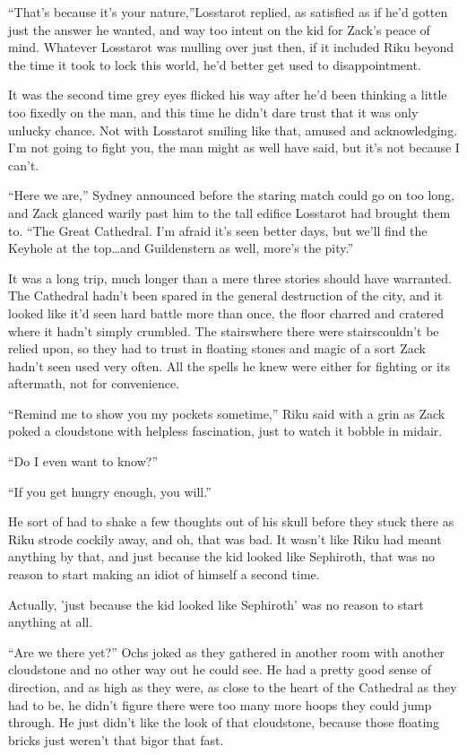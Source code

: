 ``That's because it's your nature,''Losstarot replied, as satisfied as if he'd gotten just the answer he wanted, and way too intent on the kid for Zack's peace of mind. Whatever Losstarot was mulling over just then, if it included Riku beyond the time it took to lock this world, he'd better get used to disappointment.

It was the second time grey eyes flicked his way after he'd been thinking a little too fixedly on the man, and this time he didn't dare trust that it was only unlucky chance. Not with Losstarot smiling like that, amused and acknowledging. I'm not going to fight you, the man might as well have said, but it's not because I can't.

``Here we are,'' Sydney announced before the staring match could go on too long, and Zack glanced warily past him to the tall edifice Losstarot had brought them to. ``The Great Cathedral. I'm afraid it's seen better days, but we'll find the Keyhole at the top\ldots and Guildenstern as well, more's the pity.''

It was a long trip, much longer than a mere three stories should have warranted. The Cathedral hadn't been spared in the general destruction of the city, and it looked like it'd seen hard battle more than once, the floor charred and cratered where it hadn't simply crumbled. The stairs\textemdash where there were stairs\textemdash couldn't be relied upon, so they had to trust in floating stones and magic of a sort Zack hadn't seen used very often. All the spells he knew were either for fighting or its aftermath, not for convenience.

``Remind me to show you my pockets sometime,'' Riku said with a grin as Zack poked a cloudstone with helpless fascination, just to watch it bobble in midair.

``Do I even want to know?''

``If you get hungry enough, you will.''

He sort of had to shake a few thoughts out of his skull before they stuck there as Riku strode cockily away, and oh, that was bad. It wasn't like Riku had meant anything by that, and just because the kid looked like Sephiroth, that was no reason to start making an idiot of himself a second time.

Actually, 'just because the kid looked like Sephiroth' was no reason to start anything at all.

``Are we there yet?'' Ochs joked as they gathered in another room with another cloudstone and no other way out he could see. He had a pretty good sense of direction, and as high as they were, as close to the heart of the Cathedral as they had to be, he didn't figure there were too many more hoops they could jump through. He just didn't like the look of that cloudstone, because those floating bricks just weren't that big\textemdash or that fast.

